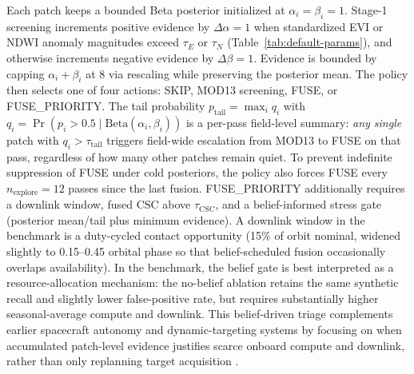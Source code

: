 \documentclass[11pt]{article}
\begin{document}
Each patch keeps a bounded Beta posterior initialized at $\alpha_i=\beta_i=1$. Stage-1 screening increments positive evidence by $\Delta\alpha=1$ when standardized EVI or NDWI anomaly magnitudes exceed $\tau_E$ or $\tau_N$ (Table~\ref{tab:default-params}), and otherwise increments negative evidence by $\Delta\beta=1$. Evidence is bounded by capping $\alpha_i+\beta_i$ at 8 via rescaling while preserving the posterior mean. The policy then selects one of four actions: SKIP, MOD13 screening, FUSE, or FUSE\_PRIORITY. The tail probability $p_\mathrm{tail}=\max_i q_i$ with $q_i=\Pr(p_i>0.5\mid \mathrm{Beta}(\alpha_i,\beta_i))$ is a per-pass field-level summary: \emph{any single} patch with $q_i>\tau_\mathrm{tail}$ triggers field-wide escalation from MOD13 to FUSE on that pass, regardless of how many other patches remain quiet. To prevent indefinite suppression of FUSE under cold posteriors, the policy also forces FUSE every $n_\mathrm{explore}=12$ passes since the last fusion. FUSE\_PRIORITY additionally requires a downlink window, fused CSC above $\tau_\mathrm{CSC}$, and a belief-informed stress gate (posterior mean/tail plus minimum evidence). A downlink window in the benchmark is a duty-cycled contact opportunity (15\% of orbit nominal, widened slightly to 0.15--0.45 orbital phase so that belief-scheduled fusion occasionally overlaps availability). In the benchmark, the belief gate is best interpreted as a resource-allocation mechanism: the no-belief ablation retains the same synthetic recall and slightly lower false-positive rate, but requires substantially higher seasonal-average compute and downlink. This belief-driven triage complements earlier spacecraft autonomy and dynamic-targeting systems by focusing on when accumulated patch-level evidence justifies scarce onboard compute and downlink, rather than only replanning target acquisition \cite{aspen-spaceops,eo1-autonomy,dynamic-targeting}.
\end{document}
